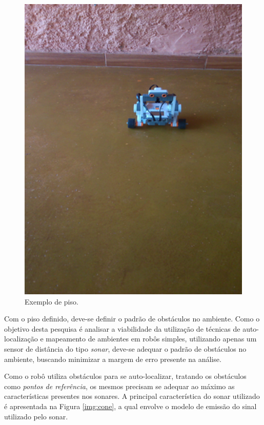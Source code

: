 	\begin{figure}[H]
		\centering
		\includegraphics[scale=0.8]{figuras/piso_ambiente.eps}
		\caption[Exemplo de piso]{Exemplo de piso.}
		\label{img:piso_ambiente}
	\end{figure}

	Com o piso definido, deve-se definir o padrão de obstáculos no ambiente. Como o objetivo desta pesquisa é analisar a viabilidade da utilização de técnicas de auto-localização e mapeamento de ambientes em robôs simples, utilizando apenas um sensor de distância do tipo \textit{sonar}, deve-se adequar o padrão de obstáculos no ambiente, buscando minimizar a margem de erro presente na análise.

	Como o robô utiliza obstáculos para se auto-localizar, tratando os obstáculos como \textit{pontos de referência}, os mesmos precisam se adequar ao máximo as características presentes nos sonares. A principal característica do sonar utilizado é apresentada na Figura \ref{img:cone}, a qual envolve o modelo de emissão do sinal utilizado pelo sonar.

